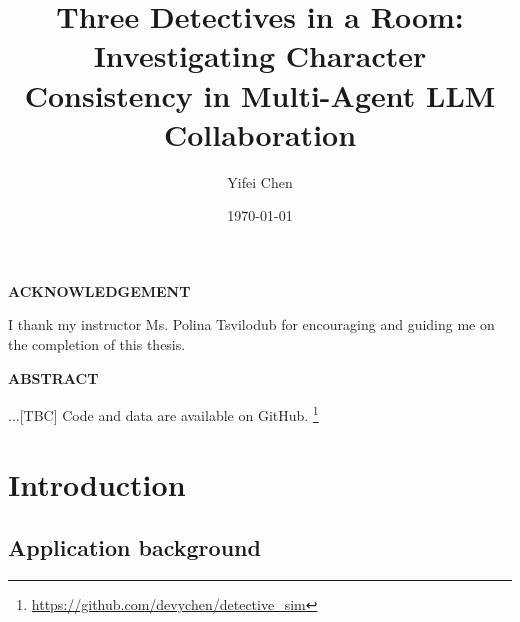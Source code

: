 \documentclass{article}
\title{Three Detectives in a Room: Investigating Character Consistency in Multi-Agent LLM Collaboration}
\author{Yifei Chen}
\date{\today}
\begin{document}
\maketitle

\newpage


\begin{center}
  \normalsize\bfseries\MakeUppercase{ACKNOWLEDGEMENT}
\end{center}

I thank my instructor Ms. Polina Tsvilodub for encouraging and guiding me on the completion of this thesis.

\newpage


\begin{center}
  \normalsize\bfseries\MakeUppercase{ABSTRACT}
\end{center}


...[TBC] Code and data are available on GitHub. \footnote{\url{https://github.com/devychen/detective_sim}}



\newpage





\listoffigures
\listoftables


\newpage


\tableofcontents 

\newpage




\section{Introduction}

\subsection{Application background}
\end{document}
